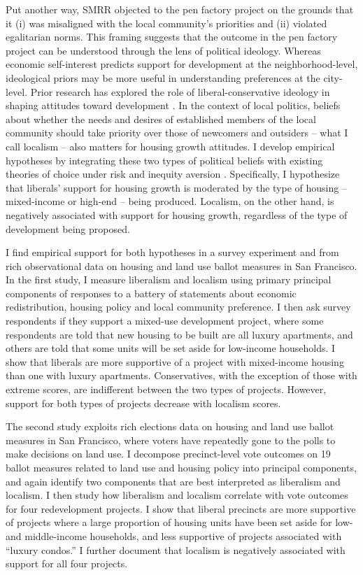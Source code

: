 \documentclass[article,12pt]{memoir}
\begin{document}
Put another way, SMRR objected to the pen factory project on the grounds that it (i) was misaligned with the local community's priorities and (ii) violated egalitarian norms. This framing suggests that the outcome in the pen factory project can be understood through the lens of political ideology. Whereas economic self-interest predicts support for development at the neighborhood-level, ideological priors may be more useful in understanding preferences at the city-level.  Prior research has explored the role of liberal-conservative ideology in shaping attitudes toward development \citep{lewis_complexity_2010,marble_where_2018,hankinson_when_2018}. In the context of local politics, beliefs about whether the needs and desires of established members of the local community should take priority over those of newcomers and outsiders -- what I call localism -- also matters for housing growth attitudes. 
I develop empirical hypotheses by integrating these two types of political beliefs with existing theories of choice under risk \citep{kahneman_prospect_1979} and inequity aversion \citep{fehr_theory_1999}. Specifically, I hypothesize that liberals' support for housing growth is moderated by the type of housing -- mixed-income or high-end -- being produced.  Localism, on the other hand, is negatively associated with support for housing growth, regardless of the type of development being proposed.  

I find empirical support for both hypotheses in a survey experiment and from rich observational data on housing and land use ballot measures in San Francisco. In the first study, I measure liberalism and localism using primary principal components of responses to a battery of statements about economic redistribution, housing policy and local community preference. I then ask survey respondents if they support a mixed-use development project, where some respondents are told that new housing to be built are all luxury apartments, and others are told that some units will be set aside for low-income households. I show that liberals are more supportive of a project with mixed-income housing than one with luxury apartments. Conservatives, with the exception of those with extreme scores, are indifferent between the two types of projects.  However, support for both types of projects decrease with localism scores.

The second study exploits rich elections data on housing and land use ballot measures in San Francisco, where voters have repeatedly gone to the polls to make decisions on land use. I decompose precinct-level vote outcomes on 19 ballot measures related to land use and housing policy into principal components, and again identify two components that are best interpreted as liberalism and localism. I then study how liberalism and localism correlate with vote outcomes for four redevelopment projects. I show that liberal precincts are more supportive of projects where a large proportion of housing units have been set aside for low- and middle-income households, and less supportive of projects associated with ``luxury condos.''  I further document that localism is negatively associated with support for all four projects.
\end{document}
